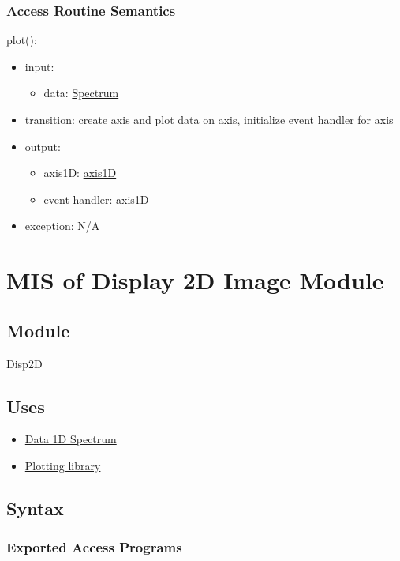 \documentclass[12pt, titlepage]{article}
\begin{document}
\subsubsection{Access Routine Semantics}

\noindent plot():
\begin{itemize}
    \item input:
    \begin{itemize}
        \item data: \hyperref[Mod:Spectrum]{Spectrum}
    \end{itemize}
    \item transition: create axis and plot data on axis, initialize event
    handler for axis
    \item output:
    \begin{itemize}
        \item axis1D: \hyperref[Mod:Plotting]{axis1D}
        \item event handler: \hyperref[Mod:Plotting]{axis1D}
    \end{itemize}
    \item exception: N/A
\end{itemize}

\section{MIS of Display 2D Image Module} \label{Mod:Disp2D}

\subsection{Module}

Disp2D

\subsection{Uses}
\begin{itemize}
    \item \hyperref[Mod:Spectrum]{Data 1D Spectrum}
    \item \hyperref[Mod:Plotting]{Plotting library}
\end{itemize}

\subsection{Syntax}

\subsubsection{Exported Access Programs}
\end{document}
